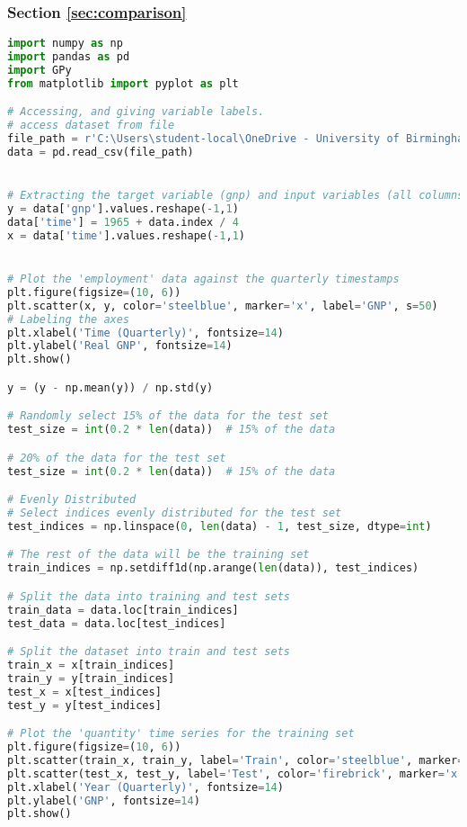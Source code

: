 \documentclass[12pt,a4paper]{article}
\begin{document}
\subsubsection{Section \ref{sec:comparison}}

\vspace{10pt}
\begin{lstlisting}[language=python, caption={Code of the Creation of Figures \ref{fig:Orange County plot},\ref{fig:SE+Lin Gpregression}, \ref{fig:SE*Lin Gpregression}}]
import numpy as np
import pandas as pd
import GPy
from matplotlib import pyplot as plt

# Accessing, and giving variable labels.
# access dataset from file
file_path = r'C:\Users\student-local\OneDrive - University of Birmingham\Dissertation\OrangeCounty.csv'
data = pd.read_csv(file_path)


# Extracting the target variable (gnp) and input variables (all columns except 'gnp')
y = data['gnp'].values.reshape(-1,1)
data['time'] = 1965 + data.index / 4
x = data['time'].values.reshape(-1,1)


# Plot the 'employment' data against the quarterly timestamps
plt.figure(figsize=(10, 6))
plt.scatter(x, y, color='steelblue', marker='x', label='GNP', s=50)
# Labeling the axes
plt.xlabel('Time (Quarterly)', fontsize=14)
plt.ylabel('Real GNP', fontsize=14)
plt.show()

y = (y - np.mean(y)) / np.std(y)

# Randomly select 15% of the data for the test set
test_size = int(0.2 * len(data))  # 15% of the data

# 20% of the data for the test set
test_size = int(0.2 * len(data))  # 15% of the data

# Evenly Distributed
# Select indices evenly distributed for the test set
test_indices = np.linspace(0, len(data) - 1, test_size, dtype=int)

# The rest of the data will be the training set
train_indices = np.setdiff1d(np.arange(len(data)), test_indices)

# Split the data into training and test sets
train_data = data.loc[train_indices]
test_data = data.loc[test_indices]

# Split the dataset into train and test sets
train_x = x[train_indices]  
train_y = y[train_indices]  
test_x = x[test_indices]    
test_y = y[test_indices]

# Plot the 'quantity' time series for the training set
plt.figure(figsize=(10, 6))
plt.scatter(train_x, train_y, label='Train', color='steelblue', marker='x', s=50)
plt.scatter(test_x, test_y, label='Test', color='firebrick', marker='x', s=50)
plt.xlabel('Year (Quarterly)', fontsize=14)
plt.ylabel('GNP', fontsize=14)
plt.show()


\end{lstlisting}
\end{document}
